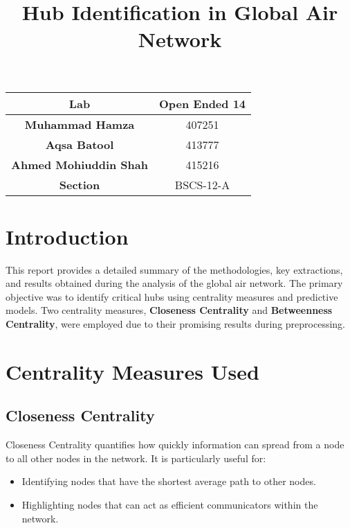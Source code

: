 \documentclass[12pt]{article}
\begin{document}
\title{Hub Identification in Global Air Network}
\author{
}
\date{}
\maketitle

\begin{table}[h!]
	\centering
	\begin{tabular}{|c|c|}
		\hline
		\textbf{Lab}                  & \textbf{Open Ended 14} \\
		\hline
		\textbf{Muhammad Hamza}       & 407251                 \\
		\hline
		\textbf{Aqsa Batool}          & 413777                 \\
		\hline
		\textbf{Ahmed Mohiuddin Shah} & 415216                 \\
		\hline
		\textbf{Section}              & BSCS-12-A              \\
		\hline
	\end{tabular}
\end{table}
\section*{Introduction}
This report provides a detailed summary of the methodologies, key extractions, and results obtained during the analysis of the global air network. The primary objective was to identify critical hubs using centrality measures and predictive models. Two centrality measures, \textbf{Closeness Centrality} and \textbf{Betweenness Centrality}, were employed due to their promising results during preprocessing.

\section*{Centrality Measures Used}
\subsection*{Closeness Centrality}
Closeness Centrality quantifies how quickly information can spread from a node to all other nodes in the network. It is particularly useful for:
\begin{itemize}
	\item Identifying nodes that have the shortest average path to other nodes.
	\item Highlighting nodes that can act as efficient communicators within the network.
\end{itemize}
\end{document}
